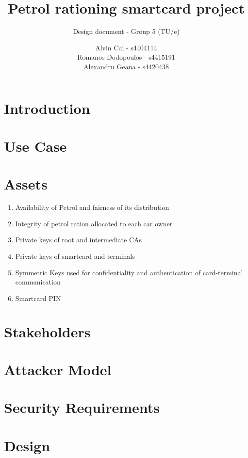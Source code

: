 \documentclass[a4paper,10pt]{llncs}
\title{Petrol rationing smartcard project}
\subtitle{Design document - Group 5 (TU/e)}
\author{Alvin Cai - s4404114 \\ Romanos Dodopoulos - s4415191 \\ Alexandru Geana - s4420438}
\institute{}
\begin{document}
\maketitle

\section{Introduction}


\section{Use Case}


\section{Assets}

\begin{enumerate}
  \item Availability of Petrol and fairness of its distribution
  \item Integrity of petrol ration allocated to each car owner
  \item Private keys of root and intermediate CAs
  \item Private keys of smartcard and terminals
  \item Symmetric Keys used for confidentiality and authentication of card-terminal communication
  \item Smartcard PIN 
\end{enumerate}

\section{Stakeholders}


\section{Attacker Model}


\section{Security Requirements}


\section{Design}
\end{document}
